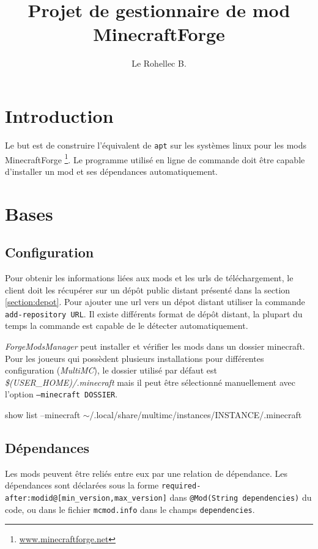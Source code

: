 \documentclass{article}
\title{Projet de gestionnaire de mod MinecraftForge}
\author{Le Rohellec B.}
\newenvironment{code}{%
\par
\vspace{3mm}
\ttfamily
}{%
\normalfont
\vspace{3mm}
\par
}
\begin{document}
\maketitle
\tableofcontents
\newpage


\section*{Introduction}
Le but est de construire l'équivalent de \texttt{apt} sur les systèmes linux pour les mods MinecraftForge \footnote{\url{www.minecraftforge.net}}.
Le programme utilisé en ligne de commande doit être capable d'installer un mod et ses dépendances automatiquement.

%
%
\section{Bases}
\label{section:bases}
\subsection{Configuration}
Pour obtenir les informations liées aux mods et les urls de téléchargement, le client doit les récupérer sur un dépôt public distant présenté dans la section \ref{section:depot}.
Pour ajouter une url vers un dépot distant utiliser la commande \texttt{add-repository URL}.
Il existe différents format de dépôt distant, la plupart du temps la commande est capable de le détecter automatiquement.

\textit{ForgeModsManager} peut installer et vérifier les mods dans un dossier minecraft.
Pour les joueurs qui possèdent plusieurs installations pour différentes configuration (\textit{MultiMC}), le dossier utilisé par défaut est \textit{\$(USER\_HOME)/.minecraft} mais il peut être sélectionné manuellement avec l'option \texttt{--minecraft DOSSIER}.

\begin{code}
	show list --minecraft $\sim$/.local/share/multimc/instances/INSTANCE/.minecraft
\end{code}

\subsection{Dépendances}
Les mods peuvent être reliés entre eux par une relation de dépendance.
Les dépendances sont déclarées sous la forme \verb|required-after:modid@[min_version,max_version]| dans \verb|@Mod(String dependencies)| du code, ou dans le fichier \texttt{mcmod.info} dans le champs \texttt{dependencies}.
\end{document}
